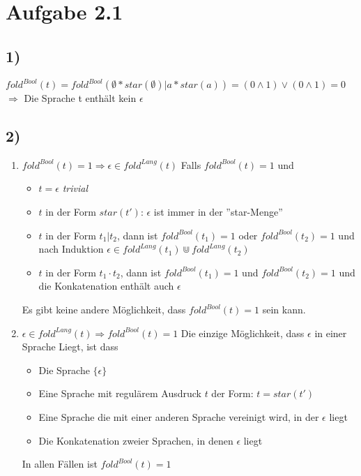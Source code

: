 \section*{Aufgabe 2.1}
\subsection*{1)}
$fold^{Bool}(t) =
fold^{Bool}(\emptyset * star(\emptyset) | a * star(a)) = 
(0 \wedge 1) \vee (0 \wedge 1) = 0$ \\
$\Rightarrow$ Die Sprache t enthält kein $\epsilon$
\subsection*{2)}
\begin{enumerate}
    \item $fold^{Bool}(t)=1\Rightarrow\epsilon\in fold^{Lang}(t)$
    Falls $fold^{Bool}(t)=1$ und
    \begin{itemize}
        \item $t=\epsilon$ \textit{trivial}
        \item $t$ in der Form $star(t')$: $\epsilon$ ist immer in der ''star-Menge''
        \item $t$ in der Form $t_1 | t_2$, dann ist 
        $fold^{Bool}(t_1)=1$ oder $fold^{Bool}(t_2)=1$ und nach Induktion $\epsilon\in fold^{Lang}(t_1)\Cup fold^{Lang}(t_2)$
        \item $t$ in der Form $t_1 \cdot t_2$, dann ist $fold^{Bool}(t_1)=1$ und $fold^{Bool}(t_2)=1$ und die Konkatenation enthält auch $\epsilon$
    \end{itemize}
    Es gibt keine andere Möglichkeit, dass $fold^{Bool}(t)=1$ sein kann.
    \item $\epsilon\in fold^{Lang}(t) \Rightarrow fold^{Bool}(t)=1$
    Die einzige Möglichkeit, dass $\epsilon$ in einer Sprache Liegt, ist dass
    \begin{itemize}
        \item Die Sprache $\{\epsilon\}$
        \item Eine Sprache mit regulärem Ausdruck $t$ der Form: $t=star(t')$
        \item Eine Sprache die mit einer anderen Sprache vereinigt wird, in der $\epsilon$ liegt
        \item Die Konkatenation zweier Sprachen, in denen $\epsilon$ liegt
    \end{itemize}
    In allen Fällen ist $fold^{Bool}(t)=1$
\end{enumerate}
